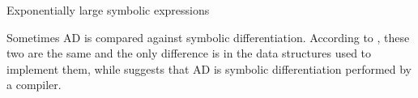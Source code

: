 Exponentially large symbolic expressions \cite{Baydin_Pearlmutter_Radul_Siskind_2015}

Sometimes AD is compared against symbolic differentiation.
According to \cite{Laue2020}, these two are the same and the only difference is in the data structures used to implement them, while \cite{Elliott_2018} suggests that AD is symbolic differentiation performed by a compiler.